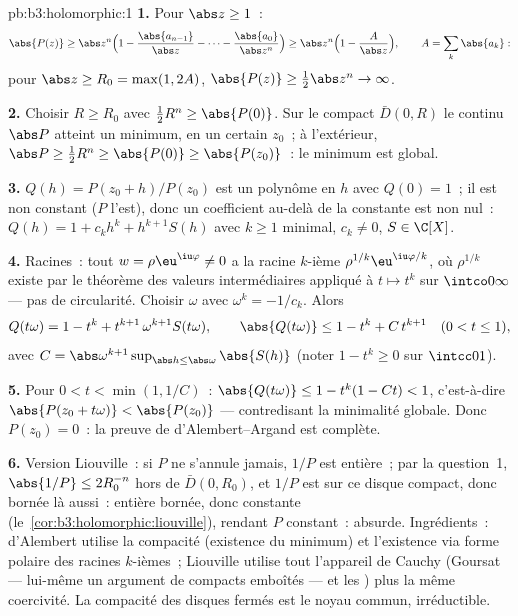 \begin{solution}{pb:b3:holomorphic:1}
\textbf{1.} Pour $\abs z \geq 1$~:
\[
\abs{P(z)} \geq \abs z^n\Bigl(1 -
\frac{\abs{a_{n-1}}}{\abs z} - \dots -
\frac{\abs{a_0}}{\abs z^n}\Bigr)
\geq \abs z^n\Bigl(1 - \frac{A}{\abs z}\Bigr),
\qquad A = \sum_k\abs{a_k} :
\]
pour $\abs z \geq R_0 = \max(1, 2A)$, $\abs{P(z)} \geq
\frac12\abs z^n \to \infty$.

\textbf{2.} Choisir $R \geq R_0$ avec $\frac12R^n \geq
\abs{P(0)}$. Sur le compact $\bar D(0, R)$ le continu $\abs
P$ atteint un minimum, en un certain $z_0$~; à l'extérieur,
$\abs P \geq \frac12R^n \geq \abs{P(0)} \geq \abs{P(z_0)}$~:
le minimum est global.

\textbf{3.} $Q(h) = P(z_0 + h)/P(z_0)$ est un polynôme en $h$
avec $Q(0) = 1$~; il est non constant ($P$ l'est), donc un
coefficient au-delà de la constante est non nul~: $Q(h) = 1
+ c_kh^k + h^{k+1}S(h)$ avec $k \geq 1$ minimal, $c_k \neq
0$, $S \in \C[X]$.

\textbf{4.} Racines~: tout $w = \rho\eu^{\iu\varphi} \neq 0$
a la racine $k$-ième $\rho^{1/k}\eu^{\iu\varphi/k}$, où
$\rho^{1/k}$ existe par le théorème des valeurs
intermédiaires appliqué à $t \mapsto t^k$ sur
$\intco0\infty$ --- pas de circularité. Choisir $\omega$
avec $\omega^k = -1/c_k$. Alors
\[
Q(t\omega) = 1 - t^k + t^{k+1}\,\omega^{k+1}S(t\omega),
\qquad
\abs{Q(t\omega)} \leq 1 - t^k + C\,t^{k+1}
\quad (0 < t \leq 1),
\]
avec $C = \abs\omega^{k+1}\sup_{\abs h \leq
\abs\omega}\abs{S(h)}$ (noter $1 - t^k \geq 0$ sur
$\intcc01$).

\textbf{5.} Pour $0 < t < \min(1, 1/C)$~: $\abs{Q(t\omega)}
\leq 1 - t^k(1 - Ct) < 1$, c'est-à-dire $\abs{P(z_0 +
t\omega)} < \abs{P(z_0)}$ --- contredisant la minimalité
globale. Donc $P(z_0) = 0$~: la preuve de d'Alembert--Argand
est complète.

\textbf{6.} Version Liouville~: si $P$ ne s'annule jamais,
$1/P$ est entière~; par la question~1, $\abs{1/P} \leq
2R_0^{-n}$ hors de $\bar D(0, R_0)$, et $1/P$ est 
sur ce disque compact, donc bornée là aussi~: entière
bornée, donc constante (le~\cref{cor:b3:holomorphic:liouville}),
rendant $P$ constant~: absurde. Ingrédients~: d'Alembert
utilise la compacité (existence du minimum) et l'existence
via forme polaire des racines $k$-ièmes~; Liouville utilise
tout l'appareil de Cauchy (Goursat --- lui-même un argument
de compacts emboîtés --- et les ) plus
la même coercivité. La compacité des disques fermés est le
noyau commun, irréductible.


\end{solution}
